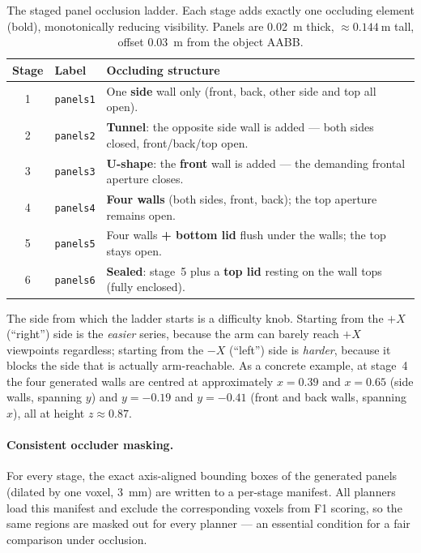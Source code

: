 \begin{table}[t]
  \centering
  \caption{The staged panel occlusion ladder. Each stage adds exactly one
    occluding element (bold), monotonically reducing visibility. Panels are
    \SI{0.02}{\meter} thick, $\approx\SI{0.144}{\meter}$ tall, offset
    \SI{0.03}{\meter} from the object AABB.}
  \label{tab:panel-stages}
  \begin{tabular}{@{}clp{7.2cm}@{}}
    \toprule
    Stage & Label & Occluding structure \\
    \midrule
    1 & \texttt{panels1} & One \textbf{side} wall only (front, back, other
        side and top all open). \\
    2 & \texttt{panels2} & \textbf{Tunnel}: the opposite side wall is added
        --- both sides closed, front/back/top open. \\
    3 & \texttt{panels3} & \textbf{U-shape}: the \textbf{front} wall is added
        --- the demanding frontal aperture closes. \\
    4 & \texttt{panels4} & \textbf{Four walls} (both sides, front, back);
        the top aperture remains open. \\
    5 & \texttt{panels5} & Four walls \textbf{+ bottom lid} flush under the
        walls; the top stays open. \\
    6 & \texttt{panels6} & \textbf{Sealed}: stage~5 plus a \textbf{top lid}
        resting on the wall tops (fully enclosed). \\
    \bottomrule
  \end{tabular}
\end{table}

The side from which the ladder starts is a difficulty knob. Starting from
the $+X$ (``right'') side is the \emph{easier} series, because the arm can
barely reach $+X$ viewpoints regardless; starting from the $-X$ (``left'')
side is \emph{harder}, because it blocks the side that is actually
arm-reachable. As a concrete example, at stage~4 the four generated walls
are centred at approximately $x=0.39$ and $x=0.65$ (side walls, spanning
$y$) and $y=-0.19$ and $y=-0.41$ (front and back walls, spanning $x$), all
at height $z\approx0.87$.

\paragraph{Consistent occluder masking.}
For every stage, the exact axis-aligned bounding boxes of the generated
panels (dilated by one voxel, \SI{3}{\milli\meter}) are written to a
per-stage manifest. All planners load this manifest and exclude the
corresponding voxels from F1 scoring, so the same regions are masked out for
every planner --- an essential condition for a fair comparison under
occlusion.
